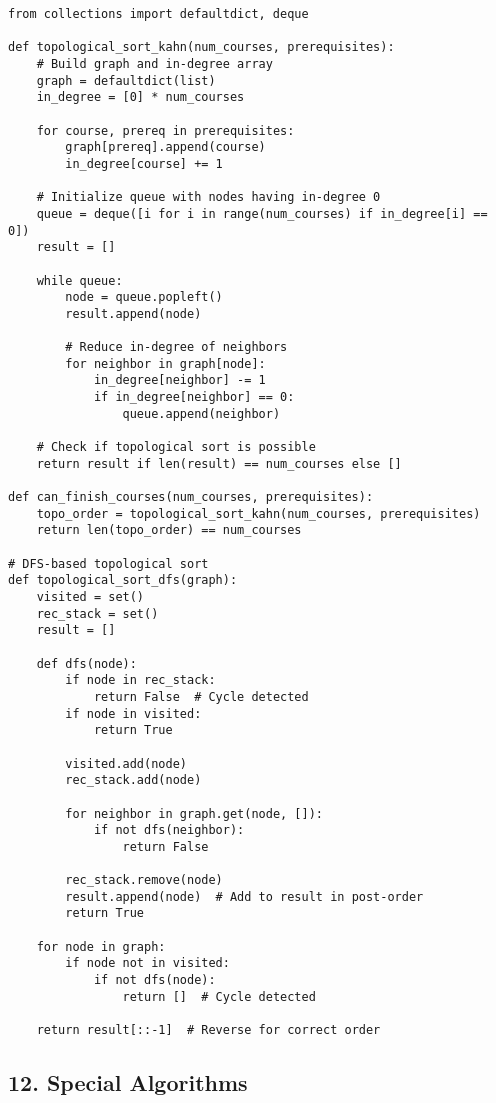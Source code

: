 \documentclass[10pt,a4paper]{article}
\begin{document}
\begin{lstlisting}
from collections import defaultdict, deque

def topological_sort_kahn(num_courses, prerequisites):
    # Build graph and in-degree array
    graph = defaultdict(list)
    in_degree = [0] * num_courses

    for course, prereq in prerequisites:
        graph[prereq].append(course)
        in_degree[course] += 1

    # Initialize queue with nodes having in-degree 0
    queue = deque([i for i in range(num_courses) if in_degree[i] == 0])
    result = []

    while queue:
        node = queue.popleft()
        result.append(node)

        # Reduce in-degree of neighbors
        for neighbor in graph[node]:
            in_degree[neighbor] -= 1
            if in_degree[neighbor] == 0:
                queue.append(neighbor)

    # Check if topological sort is possible
    return result if len(result) == num_courses else []

def can_finish_courses(num_courses, prerequisites):
    topo_order = topological_sort_kahn(num_courses, prerequisites)
    return len(topo_order) == num_courses

# DFS-based topological sort
def topological_sort_dfs(graph):
    visited = set()
    rec_stack = set()
    result = []

    def dfs(node):
        if node in rec_stack:
            return False  # Cycle detected
        if node in visited:
            return True

        visited.add(node)
        rec_stack.add(node)

        for neighbor in graph.get(node, []):
            if not dfs(neighbor):
                return False

        rec_stack.remove(node)
        result.append(node)  # Add to result in post-order
        return True

    for node in graph:
        if node not in visited:
            if not dfs(node):
                return []  # Cycle detected

    return result[::-1]  # Reverse for correct order
\end{lstlisting}

\subsection{12. Special Algorithms}
\end{document}
